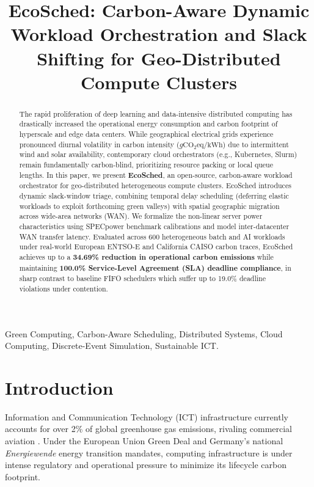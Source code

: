 \documentclass[conference]{IEEEtran}
\begin{document}
\title{EcoSched: Carbon-Aware Dynamic Workload Orchestration and Slack Shifting for Geo-Distributed Compute Clusters}

\author{
}

\maketitle

\begin{abstract}
The rapid proliferation of deep learning and data-intensive distributed computing has drastically increased the operational energy consumption and carbon footprint of hyperscale and edge data centers. While geographical electrical grids experience pronounced diurnal volatility in carbon intensity ($g\text{CO}_2\text{eq}/\text{kWh}$) due to intermittent wind and solar availability, contemporary cloud orchestrators (e.g., Kubernetes, Slurm) remain fundamentally carbon-blind, prioritizing resource packing or local queue lengths. In this paper, we present \textbf{EcoSched}, an open-source, carbon-aware workload orchestrator for geo-distributed heterogeneous compute clusters. EcoSched introduces dynamic slack-window triage, combining temporal delay scheduling (deferring elastic workloads to exploit forthcoming green valleys) with spatial geographic migration across wide-area networks (WAN). We formalize the non-linear server power characteristics using SPECpower benchmark calibrations and model inter-datacenter WAN transfer latency. Evaluated across 600 heterogeneous batch and AI workloads under real-world European ENTSO-E and California CAISO carbon traces, EcoSched achieves up to a \textbf{34.69\% reduction in operational carbon emissions} while maintaining \textbf{100.0\% Service-Level Agreement (SLA) deadline compliance}, in sharp contrast to baseline FIFO schedulers which suffer up to 19.0\% deadline violations under contention.
\end{abstract}

\begin{IEEEkeywords}
Green Computing, Carbon-Aware Scheduling, Distributed Systems, Cloud Computing, Discrete-Event Simulation, Sustainable ICT.
\end{IEEEkeywords}

\section{Introduction}
Information and Communication Technology (ICT) infrastructure currently accounts for over 2\% of global greenhouse gas emissions, rivaling commercial aviation \cite{dodge2022measuring}. Under the European Union Green Deal and Germany's national \textit{Energiewende} energy transition mandates, computing infrastructure is under intense regulatory and operational pressure to minimize its lifecycle carbon footprint.
\end{document}
